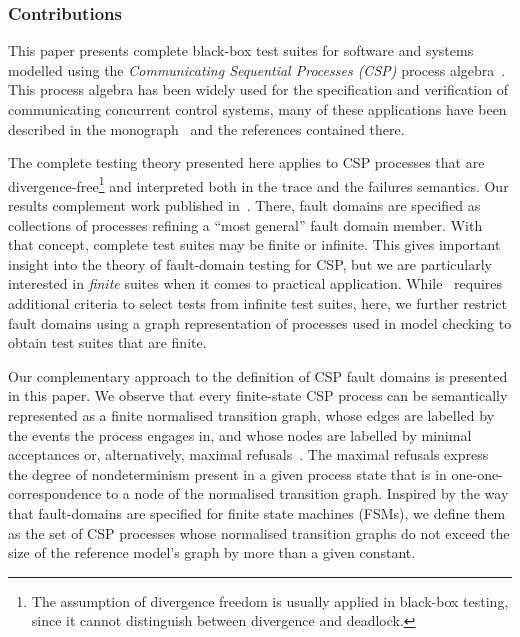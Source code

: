 
\subsubsection*{Contributions}

This paper presents complete black-box test suites for software and systems modelled using the {\it Communicating Sequential Processes (CSP)} process 
algebra~\cite{Hoare:1985:CSP:3921,Roscoe:1997:TPC:550448}. This process algebra has been widely used for the specification and verification of communicating 
concurrent control systems, many of these applications have been described in the monograph~\cite{Roscoe2010} and the references 
contained there. 

The complete testing theory presented here applies to 
CSP processes that are
divergence-free\footnote{The assumption of divergence freedom is usually
applied in black-box testing, since it cannot distinguish between divergence
and deadlock.} and interpreted both in the trace and the failures semantics.
Our results complement work published 
in~\cite{DBLP:conf/pts/CavalcantiS17}. There, fault domains are specified as
collections of processes refining a  ``most general'' fault domain member.
With that concept, complete test suites may be finite or infinite. This gives
important insight into the theory of fault-domain testing for CSP, but we are
particularly interested in {\it finite} suites when it comes to practical
application. While~\cite{DBLP:conf/pts/CavalcantiS17} requires additional
criteria to select tests from infinite test suites, here, we further restrict
fault domains using a graph representation of processes used in model
checking to obtain test suites that are finite.

Our complementary approach to the definition of CSP fault domains is
presented in this paper. We observe that every finite-state CSP process can
be semantically represented as a finite normalised transition graph, whose
edges are labelled by the events the process engages in, and whose nodes are
labelled by minimal acceptances or, alternatively, maximal
refusals~\cite{Roscoe:1994:CME:197600}. The maximal refusals express the
degree of nondeterminism present in a given process state that is in
one-one-correspondence to a node of the normalised transition graph. Inspired
by the way that fault-domains are specified for finite state machines (FSMs), we
define them as the set of CSP processes whose normalised transition graphs do
not exceed the size of the reference model's graph by more than a given
constant.

